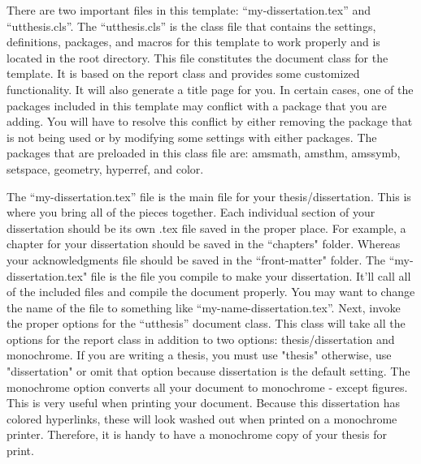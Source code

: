 There are two important files in this template: ``my-dissertation.tex'' and ``utthesis.cls''. The ``utthesis.cls'' is the class file that contains the settings, definitions, packages, and macros for this template to work properly and is located in the root directory. This file constitutes the document class for the template. It is based on the report class and provides some customized functionality. It will also generate a title page for you. In certain cases, one of the packages included in this template may conflict with a package that you are adding. You will have to resolve this conflict by either removing the package that is not being used or by modifying some settings with either packages. The packages that are preloaded in this class file are: amsmath, amsthm, amssymb, setspace, geometry, hyperref, and color.

The ``my-dissertation.tex'' file is the main file for your thesis/dissertation. This is where you bring all of the pieces together. Each individual section of your dissertation should be its own .tex file saved in the proper place. For example, a chapter for your dissertation should be saved in the ``chapters" folder. Whereas your acknowledgments file should be saved in the ``front-matter" folder. The ``my-dissertation.tex" file is the file you compile to make your dissertation. It'll call all of the included files and compile the document properly. You may want to change the name of the file to something like ``my-name-dissertation.tex''. Next, invoke the proper options for the ``utthesis'' document class. This class will take all the options for the report class in addition to two options: thesis/dissertation and monochrome. If you are writing a thesis, you must use "thesis" otherwise, use "dissertation" or omit that option because dissertation is the default setting. The monochrome option converts all your document to monochrome - except figures. This is very useful when printing your document. Because this dissertation has colored hyperlinks, these will look washed out when printed on a monochrome printer. Therefore, it is handy to have a monochrome copy of your thesis for print. 

